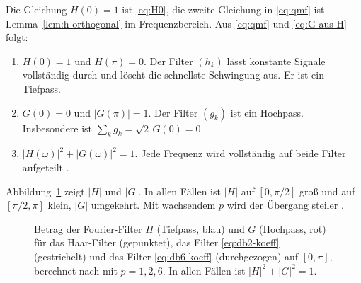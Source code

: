\documentclass[a4paper,11pt,bibliography=totoc,listof=totoc,headinclude=true,cleardoublepage=empty,oneside]{scrbook}
\theoremstyle{plain}
\theoremstyle{definition}
\begin{document}
Die Gleichung $H(0) = 1$ ist \eqref{eq:H0}, die zweite Gleichung in
\eqref{eq:qmf} ist Lemma~\ref{lem:h-orthogonal} im Frequenzbereich. Aus
\eqref{eq:qmf} und \eqref{eq:G-aus-H} folgt:
\begin{enumerate}
\item[(a)] $H(0) = 1$ und $H(\pi) = 0$. Der Filter $(h_k)$ lässt konstante
  Signale vollständig durch und löscht die schnellste Schwingung aus. Er ist ein
  Tiefpass.
\item[(b)] $G(0) = 0$ und $\lvert G(\pi)\rvert = 1$. Der Filter $(g_k)$ ist ein
  Hochpass. Insbesondere ist $\sum_k g_k = \sqrt2\,G(0) = 0$.
\item[(c)] $\lvert H(\omega)\rvert^2 + \lvert G(\omega)\rvert^2 = 1$. Jede
  Frequenz wird vollständig auf beide Filter aufgeteilt
  \cite[Bem.~2.4.19]{lmr}. %
\end{enumerate}

Abbildung~\ref{fig:tief-hochpass} zeigt $\lvert H\rvert$ und $\lvert G\rvert$.
In allen Fällen ist $\lvert H\rvert$ auf $[0,\pi/2]$ gro\ss{} und auf
$[\pi/2,\pi]$ klein, $\lvert G\rvert$ umgekehrt. Mit wachsendem $p$ wird der
Übergang steiler \cite[Lemma~2.4.32]{lmr}. %

\begin{figure}[htbp]
  \centering
  \caption[Tiefpass und Hochpass]{Betrag der Fourier-Filter $H$ (Tiefpass, blau)
  und $G$ (Hochpass, rot) für das Haar-Filter (gepunktet), das Filter
  \eqref{eq:db2-koeff} (gestrichelt) und das Filter \eqref{eq:db6-koeff}
  (durchgezogen) auf $[0,\pi]$, berechnet nach \cite[Lemma~2.4.21]{lmr} %
  mit $p = 1, 2, 6$. In allen Fällen ist
  $\lvert H\rvert^2 + \lvert G\rvert^2 = 1$.}
  \label{fig:tief-hochpass}
\end{figure}
\end{document}
